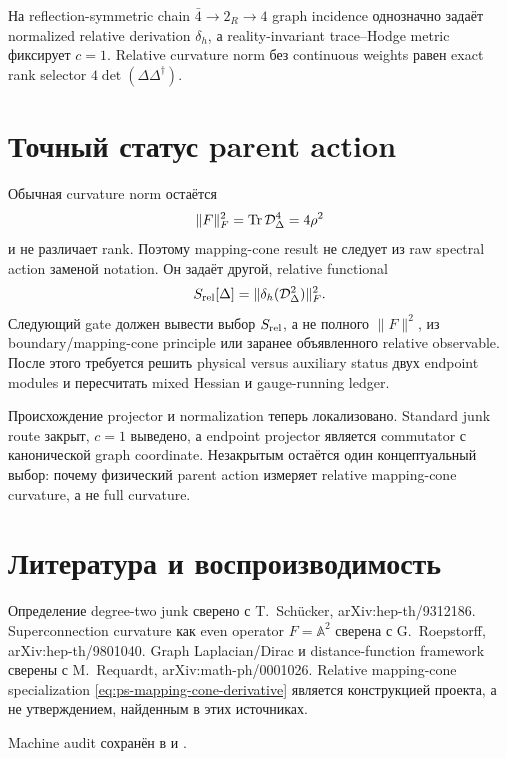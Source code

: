 \begin{theorem}
На reflection-symmetric chain \(\bar4\to2_R\to4\) graph incidence однозначно
задаёт normalized relative derivation \(\delta_h\), а reality-invariant
trace--Hodge metric фиксирует \(c=1\). Relative curvature norm без continuous
weights равен exact rank selector
\(4\det(\Delta\Delta^\dagger)\).
\end{theorem}

\section{Точный статус parent action}

Обычная curvature norm остаётся
\begin{equation}
 \|F\|_F^2=\operatorname{Tr}\mathcal D_\Delta^4=4\rho^2
\end{equation}
и не различает rank. Поэтому mapping-cone result не следует из raw spectral
action заменой notation. Он задаёт другой, relative functional
\begin{equation}
 S_{\rm rel}[\Delta]
 =\|\delta_h(\mathcal D_\Delta^2)\|_F^2.
 \label{eq:ps-relative-parent-action}
\end{equation}
Следующий gate должен вывести выбор \(S_{\rm rel}\), а не полного
\(\|F\|^2\), из boundary/mapping-cone principle или заранее объявленного
relative observable. После этого требуется решить physical versus auxiliary
status двух endpoint modules и пересчитать mixed Hessian и gauge-running
ledger.

\begin{theorem}
Происхождение projector и normalization теперь локализовано.
Standard junk route закрыт, \(c=1\) выведено, а endpoint projector
является commutator с канонической graph coordinate. Незакрытым
остаётся один концептуальный выбор: почему физический parent action
измеряет relative mapping-cone curvature, а не full curvature.
\end{theorem}

\section{Литература и воспроизводимость}

Определение degree-two junk сверено с T.~Sch\"ucker,
arXiv:hep-th/9312186. Superconnection curvature как even operator
\(F=\mathbb A^2\) сверена с G.~Roepstorff, arXiv:hep-th/9801040.
Graph Laplacian/Dirac и distance-function framework сверены с M.~Requardt,
arXiv:math-ph/0001026. Relative mapping-cone specialization
\eqref{eq:ps-mapping-cone-derivative} является конструкцией проекта, а не
утверждением, найденным в этих источниках.

Machine audit сохранён в
 и
.